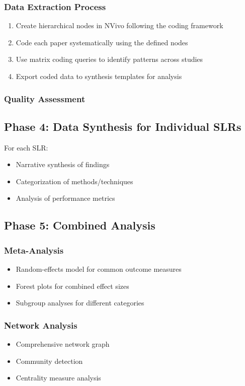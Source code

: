 \documentclass[a4paper,12pt]{article}
\begin{document}
\subsubsection{Data Extraction Process}
\begin{enumerate}
    \item Create hierarchical nodes in NVivo following the coding framework
    \item Code each paper systematically using the defined nodes
    \item Use matrix coding queries to identify patterns across studies
    \item Export coded data to synthesis templates for analysis
\end{enumerate}

\subsubsection{Quality Assessment}


\subsection{Phase 4: Data Synthesis for Individual SLRs}

For each SLR:
\begin{itemize}
    \item Narrative synthesis of findings
    \item Categorization of methods/techniques
    \item Analysis of performance metrics
\end{itemize}

\subsection{Phase 5: Combined Analysis}

\subsubsection{Meta-Analysis}
\begin{itemize}
    \item Random-effects model for common outcome measures
    \item Forest plots for combined effect sizes
    \item Subgroup analyses for different categories
\end{itemize}

\subsubsection{Network Analysis}
\begin{itemize}
    \item Comprehensive network graph
    \item Community detection
    \item Centrality measure analysis
\end{itemize}
\end{document}
